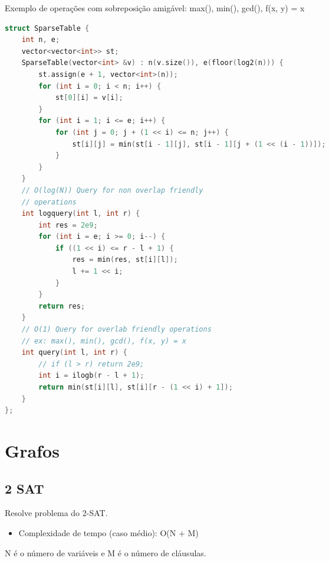 \documentclass[11pt, a4paper, oneside]{book}
\begin{document}
Exemplo de operações com sobreposição amigável: max(), min(), gcd(), f(x, y) = x





\hfill

\begin{multicols}{2}
\begin{lstlisting}[language=C++]
struct SparseTable {
    int n, e;
    vector<vector<int>> st;
    SparseTable(vector<int> &v) : n(v.size()), e(floor(log2(n))) {
        st.assign(e + 1, vector<int>(n));
        for (int i = 0; i < n; i++) {
            st[0][i] = v[i];
        }
        for (int i = 1; i <= e; i++) {
            for (int j = 0; j + (1 << i) <= n; j++) {
                st[i][j] = min(st[i - 1][j], st[i - 1][j + (1 << (i - 1))]);
            }
        }
    }
    // O(log(N)) Query for non overlap friendly
    // operations
    int logquery(int l, int r) {
        int res = 2e9;
        for (int i = e; i >= 0; i--) {
            if ((1 << i) <= r - l + 1) {
                res = min(res, st[i][l]);
                l += 1 << i;
            }
        }
        return res;
    }
    // O(1) Query for overlab friendly operations
    // ex: max(), min(), gcd(), f(x, y) = x
    int query(int l, int r) {
        // if (l > r) return 2e9;
        int i = ilogb(r - l + 1);
        return min(st[i][l], st[i][r - (1 << i) + 1]);
    }
};
\end{lstlisting}
\end{multicols}

\hfill

\newpage

%
%
%
%

\chapter{Grafos}

\section{2 SAT}


Resolve problema do 2-SAT.



\begin{itemize}
\item Complexidade de tempo (caso médio): O(N + M)
\end{itemize}



N é o número de variáveis e M é o número de cláusulas.  
\end{document}
